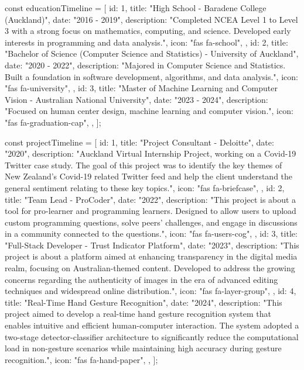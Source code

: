 const educationTimeline = [
    {
    id: 1,
    title: "High School - Baradene College (Auckland)",
    date: "2016 - 2019",
    description:
    "Completed NCEA Level 1 to Level 3 with a strong focus on mathematics, computing, and science. Developed early interests in programming and data analysis.",
    icon: "fas fa-school",
},
    {
    id: 2,
    title: "Bachelor of Science (Computer Science and Statistics) - University of Auckland",
    date: "2020 - 2022",
    description:
    "Majored in Computer Science and Statistics. Built a foundation in software development, algorithms, and data analysis.",
    icon: "fas fa-university",
},
    {
    id: 3,
    title: "Master of Machine Learning and Computer Vision - Australian National University",
    date: "2023 - 2024",
    description:
    "Focused on human center design, machine learning and computer vision.",
    icon: "fas fa-graduation-cap",
},
];

const projectTimeline = [
    {
    id: 1,
    title: "Project Consultant - Deloitte",
    date: "2020",
    description:
    "Auckland Virtual Internship Project, working on a Covid-19 Twitter case study. The goal of this project was to identify the key themes of New Zealand’s Covid-19 related Twitter feed and help the client understand the general sentiment relating to these key topics.",
    icon: "fas fa-briefcase",
},
    {
    id: 2,
    title: "Team Lead - ProCoder",
    date: "2022",
    description:
    "This project is about a tool for pro-learner and programming learners. Designed to allow users to upload custom programming questions, solve peers' challenges, and engage in discussions in a community connected to the questions.",
    icon: "fas fa-users-cog",
},
    {
    id: 3,
    title: "Full-Stack Developer - Trust Indicator Platform",
    date: "2023",
    description:
    "This project is about a platform aimed at enhancing transparency in the digital media realm, focusing on Australian-themed content. Developed to address the growing concerns regarding the authenticity of images in the era of advanced editing techniques and widespread online distribution.",
    icon: "fas fa-layer-group",
},
    {
    id: 4,
    title: "Real-Time Hand Gesture Recognition",
    date: "2024",
    description:
    "This project aimed to develop a real-time hand gesture recognition system that enables intuitive and efficient human-computer interaction. The system adopted a two-stage detector-classifier architecture to significantly reduce the computational load in non-gesture scenarios while maintaining high accuracy during gesture recognition.",
    icon: "fas fa-hand-paper",
},
];
